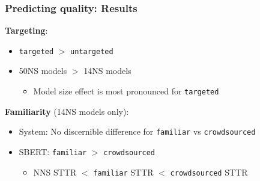\documentclass[xcolor={dvipsnames}]{beamer}
\newcommand{\param}[1]{\texttt{#1}}
\begin{document}
\begin{frame}
\frametitle{Predicting quality: Results}

\vspace{-.5em}

\pause
\textbf{Targeting}:
\begin{itemize}
\pause
\item \param{targeted} $>$ \param{untargeted}
\pause
\item 50NS models $>$ 14NS models
\begin{itemize}
\pause
\item Model size effect is most pronounced for \param{targeted}
\end{itemize}
\end{itemize}

\vspace{1em}

\pause
\textbf{Familiarity} (14NS models only):
\begin{itemize}
\pause
\item System: No discernible difference for \param{familiar} vs \param{crowdsourced}
\pause
\item SBERT: \param{familiar} $>$ \param{crowdsourced}
\begin{itemize}
\pause
\item NNS STTR $<$ \param{familiar} STTR $<$ \param{crowdsourced} STTR
\end{itemize}
\end{itemize}

\end{frame}
\end{document}
